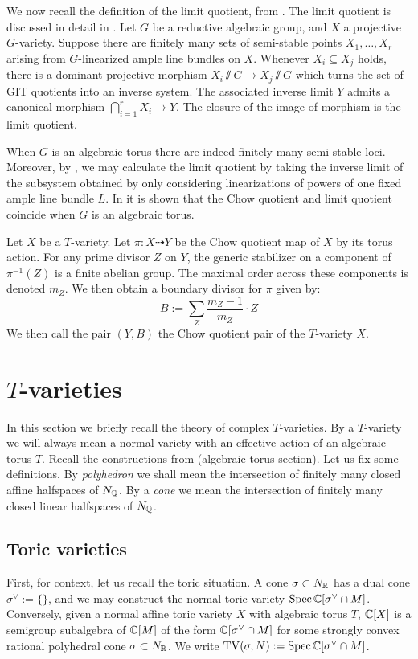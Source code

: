 We now recall the definition of the limit quotient, from \cite{mumford1994}. The limit quotient is discussed in detail in \cite{baker2012}. Let \(G\) be a reductive algebraic group, and \(X\) a projective \(G\)-variety. Suppose there are finitely many sets of semi-stable points \(X_1,\dots,X_r\) arising from \(G\)-linearized ample line bundles on \(X\).  Whenever \(X_i \subseteq X_j\) holds, there is a dominant projective morphism \(X_i \sslash G \to X_j \sslash G\) which turns the set of GIT quotients into an inverse system. The associated inverse limit \(Y\) admits a canonical morphism \(\bigcap_{i=1}^r X_i \to Y\). The closure of the image of morphism is the limit quotient.

When \(G\) is an algebraic torus there are indeed finitely many semi-stable loci. Moreover, by \cite[Corollary 2.7]{baker2012}, we may calculate the limit quotient by taking the inverse limit of the subsystem obtained by only considering linearizations of powers of one fixed ample line bundle \(L\).
%
%
%
In \cite[Proposition 2.5]{baker2012} it is shown that the Chow quotient and limit quotient coincide when \(G\) is an algebraic torus.

Let \(X\) be a \(T\)-variety. Let \(\pi:X \dashrightarrow Y\) be the Chow quotient map of \(X\) by its torus action. For any prime divisor \(Z\) on \(Y\), the generic stabilizer on a component of \(\pi^{-1}(Z)\) is a finite abelian group. The maximal order across these components is denoted \(m_Z\). We then obtain a boundary divisor for \(\pi\) given by:
\[
B := \sum_Z \frac{m_Z-1}{m_Z} \cdot Z
\]
We then call the pair \((Y,B)\) the Chow quotient pair of the \(T\)-variety \(X\).
\section{$T$-varieties} \label{prelim:Tvar}
In this section we briefly recall the theory of complex \(T\)-varieties. By a \(T\)-variety we will always mean a normal variety with an effective action of an algebraic torus \(T\). Recall the constructions from (algebraic torus section). Let us fix some definitions. By \textit{polyhedron} we shall mean the intersection of finitely many closed affine halfspaces of \(N_{\mathbb{Q}}\). By a \textit{cone} we mean the intersection of finitely many closed linear halfspaces of \(N_{\mathbb{Q}}\).
\subsection{Toric varieties}
First, for context, let us recall the toric situation. A cone \(\sigma \subset N_{\mathbb{R}}\) has a dual cone \(\sigma^\vee := \{ \}\), and we may construct the normal toric variety \(\operatorname{Spec} \mathbb{C}[\sigma^\vee \cap M]\). Conversely, given a normal affine toric variety \(X\) with algebraic torus \(T\), \(\mathbb{C}[X]\) is a semigroup subalgebra of \(\mathbb{C}[M]\) of the form \(\mathbb{C}[\sigma^\vee \cap M]\) for some strongly convex rational polyhedral cone \(\sigma \subset N_{\mathbb{R}}\). We write \(\operatorname{TV}(\sigma,N):= \operatorname{Spec} \mathbb{C}[\sigma^\vee \cap M] \).

